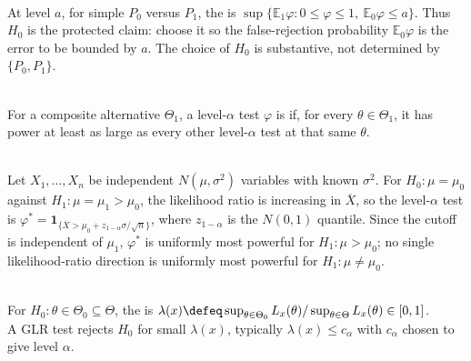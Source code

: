 \begin{remark} \label{rem:null-alternative-asymmetry} \\
At level $a$, for simple $P_0$ versus $P_1$, the  is $\sup\{\mathbb{E}_1\varphi:0\leq\varphi\leq1,\ \mathbb{E}_0\varphi\leq a\}$. Thus $H_0$ is the protected claim: choose it so the false-rejection probability $\mathbb{E}_0\varphi$ is the error to be bounded by $a$. The choice of $H_0$ is substantive, not determined by $\{P_0,P_1\}$.
\end{remark}

\begin{definition} \label{def:uniformly-most-powerful-test} \\
For a composite alternative $\Theta_1$, a level-$\alpha$ test $\varphi$ is  if, for every $\theta\in\Theta_1$, it has power at least as large as every other level-$\alpha$ test at that same $\theta$.
\end{definition}

\begin{example} \label{ex:normal-mean-np-one-sided-known-variance} \\
Let $X_1,\ldots,X_n$ be independent $N(\mu,\sigma^2)$ variables with known $\sigma^2$. For $H_0:\mu=\mu_0$ against $H_1:\mu=\mu_1>\mu_0$, the likelihood ratio is increasing in $\overline{X}$, so the level-$\alpha$ test is $\varphi^\ast=\mathbf{1}_{\{\overline{X}>\mu_0+z_{1-\alpha}\sigma/\sqrt n\}}$, where $z_{1-\alpha}$ is the $N(0,1)$ quantile. Since the cutoff is independent of $\mu_1$, $\varphi^\ast$ is uniformly most powerful for $H_1:\mu>\mu_0$; no single likelihood-ratio direction is uniformly most powerful for $H_1:\mu\neq\mu_0$.
\end{example}

\begin{definition} \label{def:generalized-likelihood-ratio-test} \\
For $H_0:\theta\in\Theta_0\subseteq\Theta$, the  is $\lambda(x)\defeq\sup_{\theta\in\Theta_0}L_x(\theta)/\sup_{\theta\in\Theta}L_x(\theta)\in[0,1]$.\\
A GLR test rejects $H_0$ for small $\lambda(x)$, typically $\lambda(x)\leq c_\alpha$ with $c_\alpha$ chosen to give level $\alpha$.
\end{definition}

